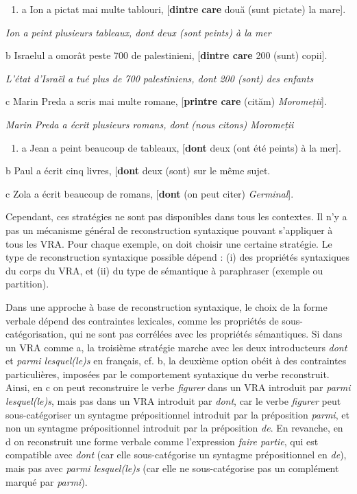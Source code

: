 \begin{enumerate}
\item \label{bkm:Ref295725397}a  Ion a pictat mai multe tablouri, [\textbf{dintre} \textbf{care} două (sunt pictate) la mare].  


\end{enumerate}
{\itshape
Ion a peint plusieurs tableaux, dont deux (sont peints) à la mer}

  b  Israelul a omorât peste 700 de palestinieni, [\textbf{dintre care} 200 (sunt) copii].

{\itshape
L'état d'Israël a tué plus de 700 palestiniens, dont 200 (sont) des enfants}

  c  Marin Preda a scris mai multe romane, [\textbf{printre care} (cităm) \textit{Moromeții}].

    \textit{Marin Preda a écrit plusieurs romans, dont (nous citons) Moromeții}


\begin{enumerate}
\item \label{bkm:Ref295725399}a  Jean a peint beaucoup de tableaux, [\textbf{dont} deux (ont été peints) à la mer]. 


\end{enumerate}
  b  Paul a écrit cinq livres, [\textbf{dont} deux (sont) sur le même sujet.

  c  Zola a écrit beaucoup de romans, [\textbf{dont} (on peut citer) \textit{Germinal}].

Cependant, ces stratégies ne sont pas disponibles dans tous les contextes. Il n'y a pas un mécanisme général de reconstruction syntaxique pouvant s'appliquer à tous les VRA. Pour chaque exemple, on doit choisir une certaine stratégie. Le type de reconstruction syntaxique possible dépend : (i) des propriétés syntaxiques du corps du VRA, et (ii) du type de sémantique à paraphraser (exemple ou partition). 

Dans une approche à base de reconstruction syntaxique, le choix de la forme verbale dépend des contraintes lexicales, comme les propriétés de sous-catégorisation, qui ne sont pas corrélées avec les propriétés sémantiques. Si dans un VRA comme a, la troisième stratégie marche avec les deux introducteurs \textit{dont} et \textit{parmi lesquel(le)s} en français, cf. b, la deuxième option obéit à des contraintes particulières, imposées par le comportement syntaxique du verbe reconstruit. Ainsi, en c on peut reconstruire le verbe \textit{figurer} dans un VRA introduit par \textit{parmi lesquel(le)s}, mais pas dans un VRA introduit par \textit{dont}, car le verbe \textit{figurer} peut sous-catégoriser un syntagme prépositionnel introduit par la préposition \textit{parmi}, et non un syntagme prépositionnel introduit par la préposition \textit{de}. En revanche, en d on reconstruit une forme verbale comme l'expression \textit{faire partie}, qui est compatible avec \textit{dont} (car elle sous-catégorise un syntagme prépositionnel en \textit{de}), mais pas avec \textit{parmi lesquel(le)s} (car elle ne sous-catégorise pas un complément marqué par \textit{parmi}).


